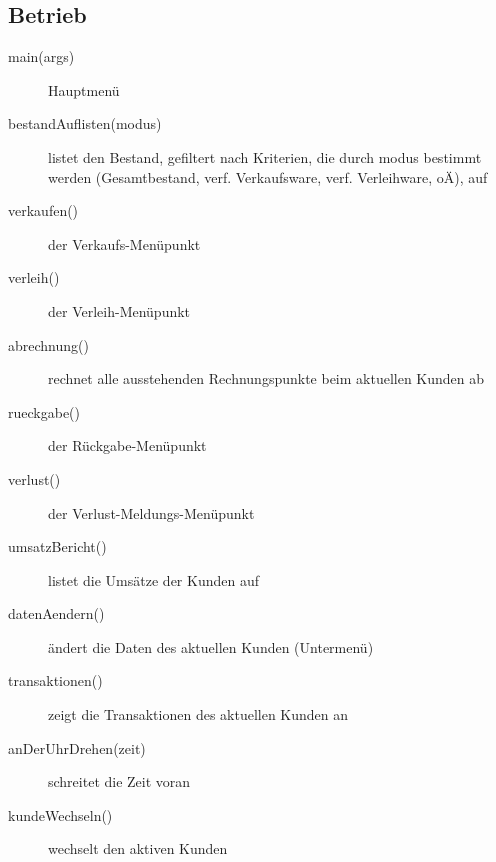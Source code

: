 \documentclass[a4paper,12pt,titlepage]{article}
\begin{document}
\subsection{Betrieb}
\begin{description}
\item[main(args)]
Hauptmenü
\item[bestandAuflisten(modus)]
listet den Bestand, gefiltert nach Kriterien, die durch modus bestimmt werden (Gesamtbestand, verf. Verkaufsware, verf. Verleihware, oÄ), auf
\item[verkaufen()]
der Verkaufs-Menüpunkt
\item[verleih()]
der Verleih-Menüpunkt
\item[abrechnung()]
rechnet alle ausstehenden Rechnungspunkte beim aktuellen Kunden ab
\item[rueckgabe()]
der Rückgabe-Menüpunkt
\item[verlust()]
der Verlust-Meldungs-Menüpunkt
\item[umsatzBericht()]
listet die Umsätze der Kunden auf
\item[datenAendern()]
ändert die Daten des aktuellen Kunden (Untermenü)
\item[transaktionen()]
zeigt die Transaktionen des aktuellen Kunden an
\item[anDerUhrDrehen(zeit)]
schreitet die Zeit voran
\item[kundeWechseln()]
wechselt den aktiven Kunden
\end{description}
\end{document}
